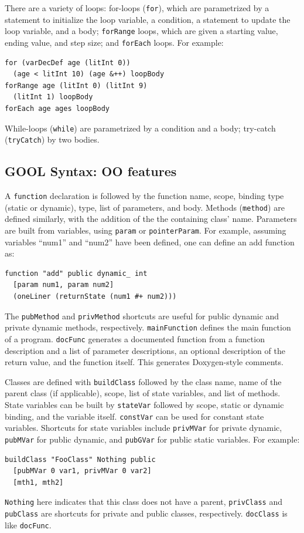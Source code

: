 \documentclass[sigplan,review,anonymous,prologue,dvipsnames]{acmart}
\begin{document}
There are a variety of loops: for-loops (\verb|for|), which are
parametrized by a statement to
initialize the loop variable, a condition, a statement to update the loop
variable, and a body; \verb|forRange| loops, which are given a
starting value, ending value, and step size; and \verb|forEach|
loops.  For example:
\begin{lstlisting}
for (varDecDef age (litInt 0))
  (age < litInt 10) (age &++) loopBody
forRange age (litInt 0) (litInt 9)
  (litInt 1) loopBody
forEach age ages loopBody
\end{lstlisting}
While-loops (\verb|while|) are parametrized by a condition and a body; 
try-catch (\verb|tryCatch|) by two bodies.

\subsection{GOOL Syntax: OO features}

A \verb|function| declaration is followed by the function
name, scope, binding type (static or dynamic), type, list of parameters, and
body. Methods (\verb|method|) are defined similarly, with the addition of the
the containing class' name.  Parameters are built from
variables, using \verb|param| or \verb|pointerParam|. For example, assuming
variables ``num1'' and ``num2'' have been defined, one can define an
\textsf{add} function as:
\begin{lstlisting}
function "add" public dynamic_ int
  [param num1, param num2]
  (oneLiner (returnState (num1 #+ num2)))
\end{lstlisting}
The  \verb|pubMethod| and \verb|privMethod| shortcuts are useful for public
dynamic and private dynamic methods, respectively. \verb|mainFunction|
defines the main function of a program. \verb|docFunc|
generates a documented function from a function description and
a list of parameter descriptions, an optional description of the return
value, and the function itself.  This generates Doxygen-style comments.

Classes are defined with \verb|buildClass| followed by the class name, name of
the parent class (if applicable), scope, list of state variables, and list of
methods. State variables can be built by \verb|stateVar| followed by scope, 
static or dynamic binding, and the variable itself.  \verb|constVar| can be 
used for constant state
variables. Shortcuts for state variables include \verb|privMVar| for private
dynamic, \verb|pubMVar| for public dynamic, and \verb|pubGVar| for public
static variables. For example:
\begin{lstlisting}
buildClass "FooClass" Nothing public
  [pubMVar 0 var1, privMVar 0 var2]
  [mth1, mth2]
\end{lstlisting}
\verb|Nothing| here indicates that this class does not have a parent,
\verb|privClass| and \verb|pubClass| are shortcuts for private and public
classes, respectively. \verb|docClass| is like \verb|docFunc|.
\end{document}

